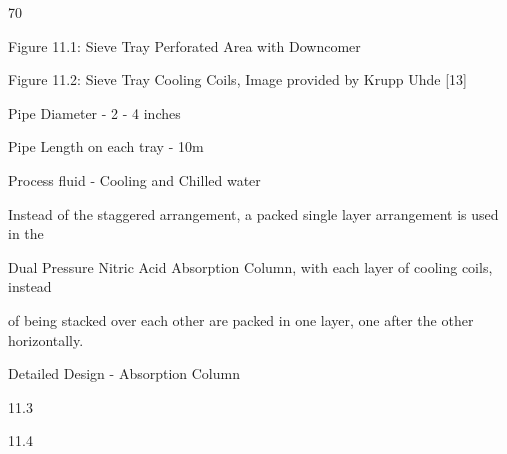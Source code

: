\documentclass[a4paper,portrait,12pt]{article}
\begin{document}
70





\begin{flushleft}
Figure 11.1: Sieve Tray Perforated Area with Downcomer
\end{flushleft}





\begin{flushleft}
Figure 11.2: Sieve Tray Cooling Coils, Image provided by Krupp Uhde [13]
\end{flushleft}





\begin{flushleft}
Pipe Diameter - 2 - 4 inches
\end{flushleft}


\begin{flushleft}
Pipe Length on each tray - 10m
\end{flushleft}


\begin{flushleft}
Process fluid - Cooling and Chilled water
\end{flushleft}


\begin{flushleft}
Instead of the staggered arrangement, a packed single layer arrangement is used in the
\end{flushleft}


\begin{flushleft}
Dual Pressure Nitric Acid Absorption Column, with each layer of cooling coils, instead
\end{flushleft}


\begin{flushleft}
of being stacked over each other are packed in one layer, one after the other horizontally.
\end{flushleft}





\begin{flushleft}
\newpage
Detailed Design - Absorption Column
\end{flushleft}





11.3





11.4
\end{document}
